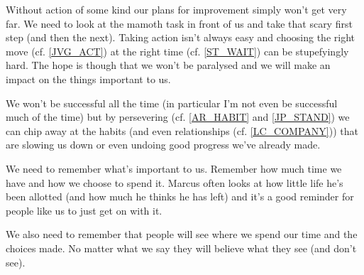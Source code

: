 \cleardoublepage

Without action of some kind our plans for improvement simply won't get very far. We need to look at the mamoth task in front of us and take that scary first step (and then the next). 
Taking action isn't always easy and choosing the right move (cf. \ref{JVG_ACT}) at the right time (cf. \ref{ST_WAIT}) can be stupefyingly hard.
The hope is though that we won't be paralysed and we will make an impact on the things important to us.

We won't be successful all the time (in particular I'm not even be successful much of the time) but by persevering (cf. \ref{AR_HABIT} and \ref{JP_STAND}) we can chip away at the habits (and even relationships (cf. \ref{LC_COMPANY})) that are slowing us down or even undoing good progress we've already made.

We need to remember what's important to us. Remember how much time we have and how we choose to spend it. Marcus often looks at how little life he's been allotted (and how much he thinks he has left) and it's a good reminder for people like us to just get on with it.

We also need to remember that people will see where we spend our time and the choices made. No matter what we say they will believe what they see (and don't see). 

\clearpage
